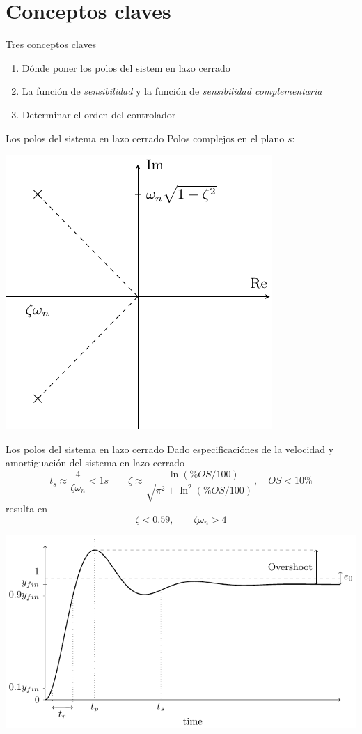 \documentclass[presentation,aspectratio=169]{beamer}
\begin{document}
\section{Conceptos claves}
\label{sec:org919cfc8}
\begin{frame}[label={sec:org11429d0}]{Tres conceptos claves}
\begin{enumerate}
\item Dónde poner los polos del sistem en lazo cerrado
\item La función de \emph{sensibilidad} y la función de \emph{sensibilidad complementaria}
\item Determinar el orden del controlador
\end{enumerate}
\end{frame}

\begin{frame}[label={sec:orgc9815c0}]{Los polos del sistema en lazo cerrado}
Polos complejos en el plano \(s\):
\begin{center}
\includegraphics[width=0.45\linewidth]{../../figures/implane-second-order-poles}
\end{center}
\end{frame}

\begin{frame}[label={sec:org31420e8}]{Los polos del sistema en lazo cerrado}
Dado especificaciónes de la velocidad y amortiguación del sistema en lazo cerrado
\[ t_s \approx \frac{4}{\zeta\omega_n} < 1 s \qquad \zeta \approx \frac{-\ln (\%OS/100)}{\sqrt{\pi^2 + \ln^2(\%OS/100)}}, \quad OS < 10\%  \]
resulta en 
\[ \zeta < 0.59,  \qquad \zeta\omega_n > 4\]

\begin{center}
\includegraphics[width=0.6\linewidth]{../../figures/step-response-specifications}
\end{center}
\end{frame}
\end{document}
